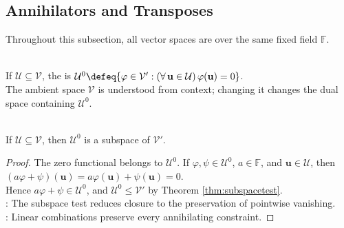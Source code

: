 \subsection{Annihilators and Transposes}
Throughout this subsection, all vector spaces are over the same fixed field $\mathbb{F}$.

\begin{definition} \label{def:annihilator} \\
If $\mathcal{U}\subseteq\mathcal{V}$, the  is $\mathcal{U}^0\defeq\{\varphi\in\mathcal{V}':(\forall\,\mathbf{u}\in\mathcal{U})\,\varphi(\mathbf{u})=0\}$.\\
The ambient space $\mathcal{V}$ is understood from context; changing it changes the dual space containing $\mathcal{U}^0$.
\end{definition}

\begin{proposition} \label{prop:annihilator-is-subspace} \\
If $\mathcal{U}\subseteq\mathcal{V}$, then $\mathcal{U}^0$ is a subspace of $\mathcal{V}'$.
\begin{proof}
The zero functional belongs to $\mathcal{U}^0$. If $\varphi,\psi\in\mathcal{U}^0$, $a\in\mathbb{F}$, and $\mathbf{u}\in\mathcal{U}$, then $(a\varphi+\psi)(\mathbf{u})=a\varphi(\mathbf{u})+\psi(\mathbf{u})=0$.\\
Hence $a\varphi+\psi\in\mathcal{U}^0$, and $\mathcal{U}^0\leq\mathcal{V}'$ by Theorem \ref{thm:subspacetest}.\\
: The subspace test reduces closure to the preservation of pointwise vanishing.\\
: Linear combinations preserve every annihilating constraint.
\end{proof}
\end{proposition}

